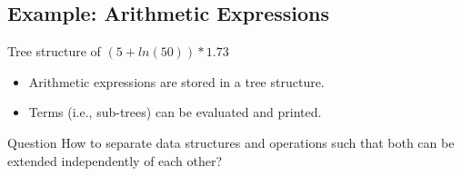 \subsection{Example: Arithmetic Expressions}

\begin{frame}[fragile]{\myframetitle}
	\begin{fancycolumns}[widths={50}]
		\begin{exampletight}{Tree structure of $(5 + ln(50)) * 1.73$}
			\centering
		\end{exampletight}
	\nextcolumn
		\begin{example}{}
			\begin{itemize}
				\item Arithmetic expressions are stored in a tree structure.
				\item Terms (i.e., sub-trees) can be evaluated and printed.
			\end{itemize}
		\end{example}
		\begin{note}{Question}
			How to separate data structures and operations such that both can be extended independently of each other?
		\end{note}
	\end{fancycolumns}
\end{frame}

